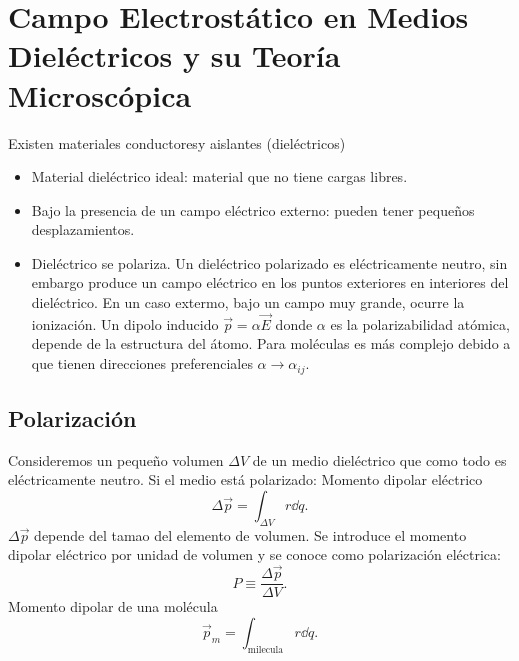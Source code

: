 \chapter{Campo Electrostático en Medios Dieléctricos y su Teoría Microscópica}
Existen materiales conductoresy aislantes (dieléctricos)
\begin{itemize}
	\item Material dieléctrico ideal: material que no tiene cargas libres.
	\item Bajo la presencia de un campo eléctrico externo: pueden tener pequeños desplazamientos.
	\item Dieléctrico se polariza. Un dieléctrico polarizado es eléctricamente neutro, sin embargo produce un campo eléctrico en los puntos exteriores en interiores del dieléctrico. En un caso extermo, bajo un campo muy grande, ocurre la ionización. Un dipolo inducido $\vec{p} = \alpha \vec{E}$ donde $\alpha$ es la polarizabilidad atómica, depende de la estructura del átomo. Para moléculas es más complejo debido a que tienen direcciones preferenciales $\alpha \to \alpha _{ij}$.
\end{itemize}

\section{Polarización}
Consideremos un pequeño volumen $\Delta V$ de un medio dieléctrico que como todo es eléctricamente neutro. Si el medio está polarizado: Momento dipolar eléctrico
	\begin{equation}
		\Delta \vec{p} = \int _{\Delta V} r\dd{q}.
	\end{equation}
$\Delta \vec{p}$ depende del tamao del elemento de volumen. Se introduce el momento dipolar eléctrico por unidad de volumen y se conoce como polarización eléctrica:
\begin{equation}
	P \equiv \frac{\Delta \vec{p}}{\Delta V}.
\end{equation}
Momento dipolar de una molécula
\begin{equation}
	\vec{p} _m = \int _{\text{milecula}} r\dd{q}.
\end{equation}



